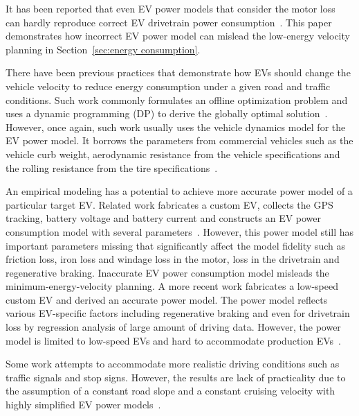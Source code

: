 \documentclass{IEEEtran}
\begin{document}
It has been reported that even EV power models that consider the motor loss~\cite{Lin:ICCA14, Wu:ITS15, Dib:IVPPC11} can hardly reproduce correct EV drivetrain power consumption~\cite{Hong:ASPDAC16}. This paper  demonstrates how incorrect EV power model can mislead the low-energy velocity planning in Section~\ref{sec:energy consumption}. 

There have been previous practices that demonstrate how EVs should change the vehicle velocity to reduce energy consumption under  a given road and traffic conditions. Such work commonly formulates an offline optimization problem and uses a dynamic programming (DP) to derive the globally optimal solution~\cite{Lin:ICCA14, Dib:IVPPC11, Dib:OGST12, Mensing:TR13}. However, once again, such work usually uses the vehicle dynamics model for the EV power model. It borrows the parameters from commercial vehicles such as the vehicle curb weight, aerodynamic resistance from the vehicle specifications and the rolling resistance from the tire specifications~\cite{Lin:ICCA14}. 

An empirical modeling has a potential to achieve more accurate power model  of a particular target EV. Related work fabricates a custom EV, collects the GPS tracking, battery voltage and battery current and constructs an EV power consumption model with several parameters~\cite{Dib:IVPPC11}. However, this power model still has important parameters missing that significantly affect the model fidelity such as friction loss, iron loss and windage loss in the motor, loss in the drivetrain and regenerative braking. Inaccurate EV power consumption model misleads the minimum-energy-velocity planning. A more recent work fabricates a low-speed custom EV and derived an accurate power model. The power model reflects various EV-specific factors including regenerative braking and even for drivetrain loss by regression analysis of large amount of driving data. However, the power model is limited to low-speed EVs and hard to accommodate production EVs~\cite{Hong:ASPDAC16}. 

Some work attempts to accommodate more realistic driving conditions such as traffic signals and stop signs. However, the results are lack of practicality due to the assumption of a constant road slope and a constant cruising velocity with highly simplified EV power models~\cite{Yan:NAPS14, Dib:CEP14, Wu:ITS15}. 
\end{document}
